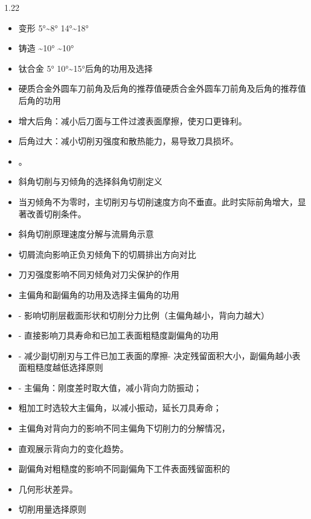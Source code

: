 \documentclass[12pt,a4paper]{article}
\begin{document}
\begin{spacing}{1.22}
\begin{itemize}[leftmargin=2.2em,label=--]
  \item 变形 5°\textasciitilde{}8° 14°\textasciitilde{}18°
  \item 铸造 \textasciitilde{}10° \textasciitilde{}10°
  \item 钛合金 5° 10°\textasciitilde{}15°后角的功用及选择
  \item 硬质合金外圆车刀前角及后角的推荐值硬质合金外圆车刀前角及后角的推荐值后角的功用
  \item 增大后角：减小后刀面与工件过渡表面摩擦，使刃口更锋利。
  \item 后角过大：减小切削刃强度和散热能力，易导致刀具损坏。
  \item 。
  \item 斜角切削与刃倾角的选择斜角切削定义
  \item 当刃倾角不为零时，主切削刃与切削速度方向不垂直。此时实际前角增大，显著改善切削条件。
  \item 斜角切削原理速度分解与流屑角示意
  \item 切屑流向影响正负刃倾角下的切屑排出方向对比
  \item 刀刃强度影响不同刃倾角对刀尖保护的作用
  \item 主偏角和副偏角的功用及选择主偏角的功用
  \item - 影响切削层截面形状和切削分力比例（主偏角越小，背向力越大）
  \item - 直接影响刀具寿命和已加工表面粗糙度副偏角的功用
  \item - 减少副切削刃与工件已加工表面的摩擦- 决定残留面积大小，副偏角越小表面粗糙度越低选择原则
  \item - 主偏角：刚度差时取大值，减小背向力防振动；
  \item 粗加工时选较大主偏角，以减小振动，延长刀具寿命；
  \item 主偏角对背向力的影响不同主偏角下切削力的分解情况，
  \item 直观展示背向力的变化趋势。
  \item 副偏角对粗糙度的影响不同副偏角下工件表面残留面积的
  \item 几何形状差异。
  \item 切削用量选择原则
\end{itemize}


\end{spacing}
\end{document}
